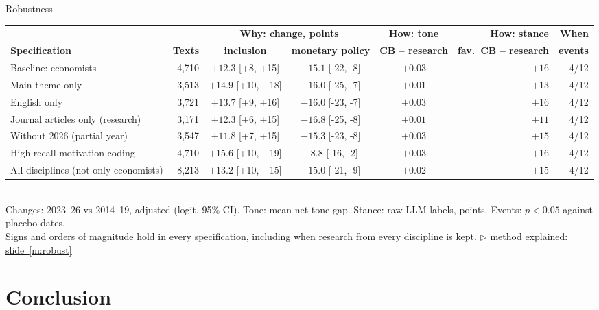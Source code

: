 \documentclass[aspectratio=169,10pt]{beamer}
\newcommand{\method}[1]{\hfill\hyperref[#1]{\tiny\textcolor{c4}{$\triangleright$ method explained: slide~\ref*{#1}}}}
\begin{document}
\begin{frame}{Robustness}
\scriptsize
\setlength{\tabcolsep}{4pt}
\begin{tabular}{@{}lrcccrr@{}}\toprule
 & & \multicolumn{2}{c}{\textbf{Why: change, points}} & \textbf{How: tone} & \textbf{How: stance} & \textbf{When}\\
\textbf{Specification} & \textbf{Texts} & \textbf{inclusion} & \textbf{monetary policy} & \textbf{CB -- research} & \textbf{fav.\ CB -- research} & \textbf{events}\\\midrule
Baseline: economists & 4,710 & $+12.3$ \tiny[+8, +15] & $-15.1$ \tiny[-22, -8] & $+0.03$ & $+16$ & 4/12 \\
Main theme only & 3,513 & $+14.9$ \tiny[+10, +18] & $-16.0$ \tiny[-25, -7] & $+0.01$ & $+13$ & 4/12 \\
English only & 3,721 & $+13.7$ \tiny[+9, +16] & $-16.0$ \tiny[-23, -7] & $+0.03$ & $+16$ & 4/12 \\
Journal articles only (research) & 3,171 & $+12.3$ \tiny[+6, +15] & $-16.8$ \tiny[-25, -8] & $+0.01$ & $+11$ & 4/12 \\
Without 2026 (partial year) & 3,547 & $+11.8$ \tiny[+7, +15] & $-15.3$ \tiny[-23, -8] & $+0.03$ & $+15$ & 4/12 \\
High-recall motivation coding & 4,710 & $+15.6$ \tiny[+10, +19] & $-8.8$ \tiny[-16, -2] & $+0.03$ & $+16$ & 4/12 \\
All disciplines (not only economists) & 8,213 & $+13.2$ \tiny[+10, +15] & $-15.0$ \tiny[-21, -9] & $+0.02$ & $+15$ & 4/12 \\
\bottomrule\end{tabular}\\[4pt]
Changes: 2023--26 vs 2014--19, adjusted (logit, 95\% CI). Tone: mean net tone gap. Stance: raw LLM labels, points. Events: $p < 0.05$ against placebo dates.\\[3pt]
\small Signs and orders of magnitude hold in every specification, including when research from every discipline is kept.
\method{m:robust}
\end{frame}

\section{Conclusion}
\end{document}
